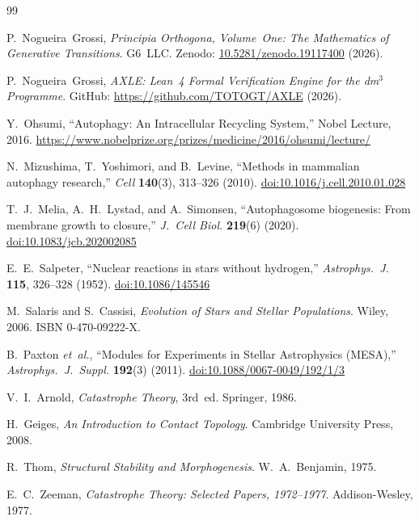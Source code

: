 \documentclass[12pt,a4paper]{article}
\begin{document}
\begin{thebibliography}{99}
\sloppy

P.~Nogueira~Grossi,
\textit{Principia Orthogona, Volume~One: The Mathematics of Generative
Transitions}.
G6~LLC. Zenodo:
\href{https://doi.org/10.5281/zenodo.19117400}{10.5281/zenodo.19117400}
(2026).

P.~Nogueira~Grossi,
\textit{AXLE: Lean~4 Formal Verification Engine for the dm$^3$ Programme}.
GitHub: \url{https://github.com/TOTOGT/AXLE} (2026).

Y.~Ohsumi,
``Autophagy: An Intracellular Recycling System,''
Nobel Lecture, 2016.
\url{https://www.nobelprize.org/prizes/medicine/2016/ohsumi/lecture/}

N.~Mizushima, T.~Yoshimori, and B.~Levine,
``Methods in mammalian autophagy research,''
\textit{Cell} \textbf{140}(3), 313--326 (2010).
\href{https://doi.org/10.1016/j.cell.2010.01.028}{doi:10.1016/j.cell.2010.01.028}

T.~J.~Melia, A.~H.~Lystad, and A.~Simonsen,
``Autophagosome biogenesis: From membrane growth to closure,''
\textit{J.~Cell Biol.} \textbf{219}(6) (2020).
\href{https://doi.org/10.1083/jcb.202002085}{doi:10.1083/jcb.202002085}

E.~E.~Salpeter,
``Nuclear reactions in stars without hydrogen,''
\textit{Astrophys.~J.} \textbf{115}, 326--328 (1952).
\href{https://doi.org/10.1086/145546}{doi:10.1086/145546}

M.~Salaris and S.~Cassisi,
\textit{Evolution of Stars and Stellar Populations}.
Wiley, 2006. ISBN 0-470-09222-X.

B.~Paxton \textit{et~al.},
``Modules for Experiments in Stellar Astrophysics (MESA),''
\textit{Astrophys.~J.~Suppl.} \textbf{192}(3) (2011).
\href{https://doi.org/10.1088/0067-0049/192/1/3}{doi:10.1088/0067-0049/192/1/3}

V.~I.~Arnold,
\textit{Catastrophe Theory}, 3rd~ed.
Springer, 1986.

H.~Geiges,
\textit{An Introduction to Contact Topology}.
Cambridge University Press, 2008.

R.~Thom,
\textit{Structural Stability and Morphogenesis}.
W.~A.~Benjamin, 1975.

E.~C.~Zeeman,
\textit{Catastrophe Theory: Selected Papers, 1972--1977}.
Addison-Wesley, 1977.

\end{thebibliography}
\end{document}
